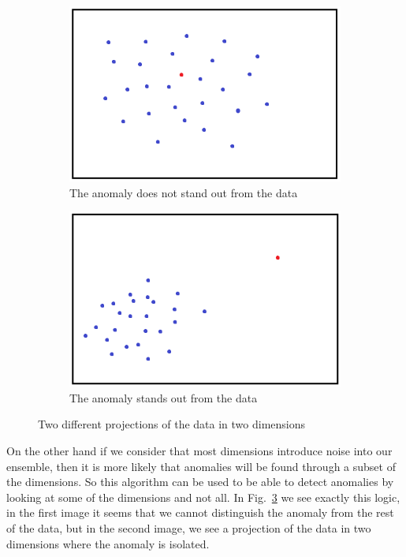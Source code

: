 \documentclass[a4paper,12pt]{report}
\theoremstyle{definitionNODot}
\begin{document}
	\begin{figure}[h]
		\begin{subfigure}[b]{0.49\textwidth}
			\centering
			\includegraphics[width=\textwidth]{featurebaggingA.png}
			\caption{The anomaly does not stand out from the data}
			\label{fig:featurebaggingA}
		\end{subfigure}
		\hfill
		\begin{subfigure}[b]{0.49\textwidth}
			\centering
			\includegraphics[width=\textwidth]{featurebaggingB.png}
			\caption{The anomaly stands out from the data}
			\label{fig:featurebaggingB}
		\end{subfigure}
		\caption{Two different projections of the data in two dimensions}
		\label{fig:featurebaggingAB}
	\end{figure}
	
	On the other hand if we consider that most dimensions introduce noise into our ensemble, then it is more likely that anomalies will be found through a subset of the dimensions. So this algorithm can be used to be able to detect anomalies by looking at some of the dimensions and not all. In Fig.~\ref{fig:featurebaggingAB} we see exactly this logic, in the first image it seems that we cannot distinguish the anomaly from the rest of the data, but in the second image, we see a projection of the data in two dimensions where the anomaly is isolated.
	
\end{document}
